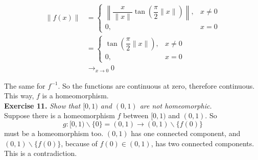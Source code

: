 \documentclass{article}
\begin{document}
    \begin{align*}
            \lVert f(x) \lVert &= \begin{cases}
            \left\lVert \dfrac{x}{\lVert x \lVert} \tan\left(\dfrac{\pi}{2}\lVert x \lVert \right) \right\lVert, &x \ne 0\\
            0, &x = 0
        \end{cases}\\
        &= \begin{cases}
            \tan\left(\dfrac{\pi}{2}\lVert x \lVert \right), &x \ne 0\\
            0, &x = 0
        \end{cases}\\
        &\to_{x \to 0} 0
    \end{align*}

    The same for $f^{-1}$. So the functions are continuous at zero, therefore continuous. This way, $f$ is a homeomorphism.\\

    \noindent\textbf{Exercise 11.} \textit{Show that $[0, 1)$ and $(0, 1)$ are not homeomorphic.}\\

    Suppose there is a homeomorphism $f$ between $[0, 1)$ and $(0, 1)$.
    So $$g: [0, 1)\backslash\{0\} = (0, 1) \to (0, 1)\backslash\{f(0)\}$$
    must be a homeomorphism too. $(0, 1)$ has one connected component, and $(0, 1)\backslash\{f(0)\}$, because of $f(0) \in (0, 1)$, has two connected components.
    This is a contradiction.
\end{document}
